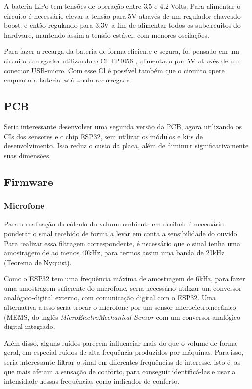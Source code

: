\documentclass[../monografia.tex]{subfiles}
\begin{document}
A bateria LiPo tem tensões de operação entre 3.5 e 4.2 Volts. Para alimentar o circuito é necessário elevar a tensão para 5V através de um regulador chaveado boost, e então regulando para 3.3V a fim de alimentar todos os subcircuitos do hardware, mantendo assim a tensão estável, com menores oscilações. 

Para fazer a recarga da bateria de forma eficiente e segura, foi pensado em um circuito carregador utilizando o CI TP4056 \cite{tp4056}, alimentado por 5V através de um conector USB-micro. Com esse CI é possível também que o circuito opere enquanto a bateria está sendo recarregada. 

\subsection{PCB}

Seria interessante desenvolver uma segunda versão da PCB, agora utilizando os CIs dos sensores e o chip ESP32, sem utilizar os módulos e kits de desenvolvimento. Isso reduz o custo da placa, além de diminuir significativamente suas dimensões. 

\subsection{Firmware}
\subsubsection{Microfone}

Para a realização do cálculo do volume ambiente em decibels é necessário ponderar o sinal recebido de forma a levar em conta a sensibilidade do ouvido. Para realizar essa filtragem correspondente, é necessário que o sinal tenha uma amostragem de ao menos 40kHz, para termos assim uma banda de 20kHz (Teorema de Nyquist). 

Como o ESP32 tem uma frequência máxima de amostragem de 6kHz, para fazer uma amostragem suficiente do microfone, seria necessário utilizar um conversor analógico-digital externo, com comunicação digital com o ESP32. Uma alternativa a isso seria trocar o microfone por um sensor microeletromecânico (MEMS, do inglês \textit{MicroElectroMechanical Sensor} com um conversor analógico-digital integrado. 

Além disso, alguns ruídos parecem influenciar mais do que o volume de forma geral, em especial ruídos de alta frequência produzidos por máquinas. Para isso, seria interessante filtrar o sinal em diferentes frequências de interesse, isto é, as que mais afetam a sensação de conforto, para conseguir identificá-las e usar a intensidade nessas frequências como indicador de conforto. 
\end{document}
